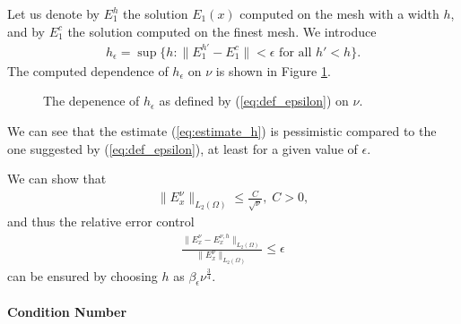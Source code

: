 Let us denote by $E_{1}^{h}$ the solution $E_{1}(x)$ computed on the mesh with a width $h$, and by $E_{1}^{c}$ the solution computed on the finest mesh. We introduce 
\begin{align}
\label{eq:def_epsilon}
h_{\epsilon}=\sup\{h: \|E_{1}^{h'}-E_{1}^{c}\|<\epsilon \text{ for all } h'<h\}.
\end{align}
The computed dependence of $h_{\epsilon}$ on $\nu$ is shown in Figure \ref{fig:dependence}.
\begin{figure}
\caption{The depenence of $h_{\epsilon}$ as defined by (\ref{eq:def_epsilon}) on $\nu$.}
\label{fig:dependence}
\end{figure}

We can see that the estimate (\ref{eq:estimate_h}) is pessimistic compared to the one suggested by (\ref{eq:def_epsilon}), 
at least for a given value of $\epsilon$.


\begin{remark}
 We can show that 
\begin{align*}
 \|E^{\nu}_{x}\|_{L_{2}(\Omega)}\leq \frac{C}{\sqrt{\nu}},\; C>0, 
\end{align*}
and thus the relative error control
\begin{align*}
 \frac{\|E^{\nu}_{x}-E^{\nu,h}_{x}\|_{L_{2}(\Omega)}}{\|E^{\nu}_{x}\|_{L_{2}(\Omega)}}\leq \epsilon
\end{align*}
can be ensured by choosing $h$ as $\beta_{\epsilon}\nu^{\frac{3}{4}}$.
\end{remark}


\paragraph{Condition Number}


